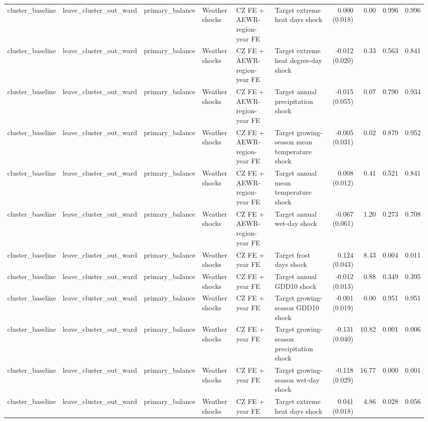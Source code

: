 \begin{tabular}{llllllrrrr}
cluster_baseline & leave_cluster_out_ward & primary_balance & Weather shocks & CZ FE + AEWR-region-year FE & Target extreme heat days shock & 0.000 (0.018) & 0.00 & 0.996 & 0.996 \\
cluster_baseline & leave_cluster_out_ward & primary_balance & Weather shocks & CZ FE + AEWR-region-year FE & Target extreme heat degree-day shock & -0.012 (0.020) & 0.33 & 0.563 & 0.841 \\
cluster_baseline & leave_cluster_out_ward & primary_balance & Weather shocks & CZ FE + AEWR-region-year FE & Target annual precipitation shock & -0.015 (0.055) & 0.07 & 0.790 & 0.934 \\
cluster_baseline & leave_cluster_out_ward & primary_balance & Weather shocks & CZ FE + AEWR-region-year FE & Target growing-season mean temperature shock & -0.005 (0.031) & 0.02 & 0.879 & 0.952 \\
cluster_baseline & leave_cluster_out_ward & primary_balance & Weather shocks & CZ FE + AEWR-region-year FE & Target annual mean temperature shock & 0.008 (0.012) & 0.41 & 0.521 & 0.841 \\
cluster_baseline & leave_cluster_out_ward & primary_balance & Weather shocks & CZ FE + AEWR-region-year FE & Target annual wet-day shock & -0.067 (0.061) & 1.20 & 0.273 & 0.708 \\
cluster_baseline & leave_cluster_out_ward & primary_balance & Weather shocks & CZ FE + year FE & Target frost days shock & 0.124 (0.043) & 8.43 & 0.004 & 0.011 \\
cluster_baseline & leave_cluster_out_ward & primary_balance & Weather shocks & CZ FE + year FE & Target annual GDD10 shock & -0.012 (0.013) & 0.88 & 0.349 & 0.395 \\
cluster_baseline & leave_cluster_out_ward & primary_balance & Weather shocks & CZ FE + year FE & Target growing-season GDD10 shock & -0.001 (0.019) & 0.00 & 0.951 & 0.951 \\
cluster_baseline & leave_cluster_out_ward & primary_balance & Weather shocks & CZ FE + year FE & Target growing-season precipitation shock & -0.131 (0.040) & 10.82 & 0.001 & 0.006 \\
cluster_baseline & leave_cluster_out_ward & primary_balance & Weather shocks & CZ FE + year FE & Target growing-season wet-day shock & -0.118 (0.029) & 16.77 & 0.000 & 0.001 \\
cluster_baseline & leave_cluster_out_ward & primary_balance & Weather shocks & CZ FE + year FE & Target extreme heat days shock & 0.041 (0.018) & 4.86 & 0.028 & 0.056 \\

\end{tabular}
